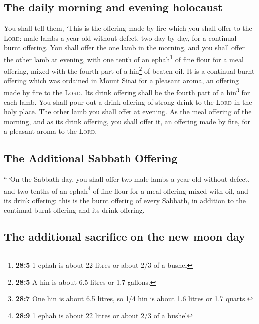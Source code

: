 \hypertarget{the-daily-morning-and-evening-holocaust}{%
\subsection{The daily morning and evening
holocaust}\label{the-daily-morning-and-evening-holocaust}}

 You shall tell them, `This is the offering made by fire
which you shall offer to the \textsc{Lord}: male lambs a year old
without defect, two day by day, for a continual burnt offering.
 You shall offer the one lamb in the morning, and you
shall offer the other lamb at evening,  with one tenth of
an ephah\footnote{\textbf{28:5} 1 ephah is about 22 litres or about 2/3
  of a bushel} of fine flour for a meal offering, mixed with the fourth
part of a hin\footnote{\textbf{28:5} A hin is about 6.5 litres or 1.7
  gallons.} of beaten oil.  It is a continual burnt
offering which was ordained in Mount Sinai for a pleasant aroma, an
offering made by fire to the \textsc{Lord}.  Its drink
offering shall be the fourth part of a hin\footnote{\textbf{28:7} One
  hin is about 6.5 litres, so 1/4 hin is about 1.6 litres or 1.7 quarts.}
for each lamb. You shall pour out a drink offering of strong drink to
the \textsc{Lord} in the holy place.  The other lamb you
shall offer at evening. As the meal offering of the morning, and as its
drink offering, you shall offer it, an offering made by fire, for a
pleasant aroma to the \textsc{Lord}.

\hypertarget{the-additional-sabbath-offering}{%
\subsection{The Additional Sabbath
Offering}\label{the-additional-sabbath-offering}}

 ``\,`On the Sabbath day, you shall offer two male lambs a
year old without defect, and two tenths of an ephah\footnote{\textbf{28:9}
  1 ephah is about 22 litres or about 2/3 of a bushel} of fine flour for
a meal offering mixed with oil, and its drink offering: 
this is the burnt offering of every Sabbath, in addition to the
continual burnt offering and its drink offering.

\hypertarget{the-additional-sacrifice-on-the-new-moon-day}{%
\subsection{The additional sacrifice on the new moon
day}\label{the-additional-sacrifice-on-the-new-moon-day}}

